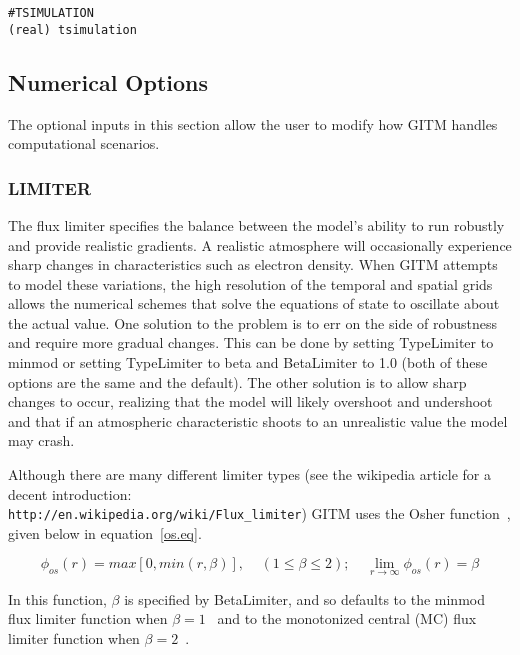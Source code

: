 \begin{verbatim}
#TSIMULATION
(real) tsimulation    
\end{verbatim}


\subsection{Numerical Options}
\label{numerical.sec}

The optional inputs in this section allow the user to modify how GITM handles computational scenarios.

\subsubsection{LIMITER}
\label{limiter.sec}

The flux limiter specifies the balance between the model's ability to run robustly and provide realistic gradients.  A realistic atmosphere will occasionally experience sharp changes in characteristics such as electron density.  When GITM attempts to model these variations, the high resolution of the temporal and spatial grids allows the numerical schemes that solve the equations of state to oscillate about the actual value.  One solution to the problem is to err on the side of robustness and require more gradual changes.  This can be done by setting TypeLimiter to minmod or setting TypeLimiter to beta and BetaLimiter to 1.0 (both of these options are the same and the default).  The other solution is to allow sharp changes to occur, realizing that the model will likely overshoot and undershoot and that if an atmospheric characteristic shoots to an unrealistic value the model may crash.

Although there are many different limiter types (see the wikipedia article for a decent introduction: {\tt \\http://en.wikipedia.org/wiki/Flux\_limiter}) GITM uses the Osher function~\citep{Chakravarthy:1983os}, given below in equation~\ref{os.eq}.

\begin{equation}
\label{os.eq}
\phi_{os}(r) = max[0,min(r,\beta)], \;\;\;\; (1 \le \beta \le 2); \;\;\;\; \lim_{r\to\infty} \phi_{os}(r) = \beta
\end{equation}

In this function, $\beta$ is specified by BetaLimiter, and so defaults to the minmod flux limiter function when $\beta = 1$~\citep{roe:1986aa} and to the monotonized central (MC) flux limiter function when $\beta = 2$~\citep{valLeer:1977aa}.

